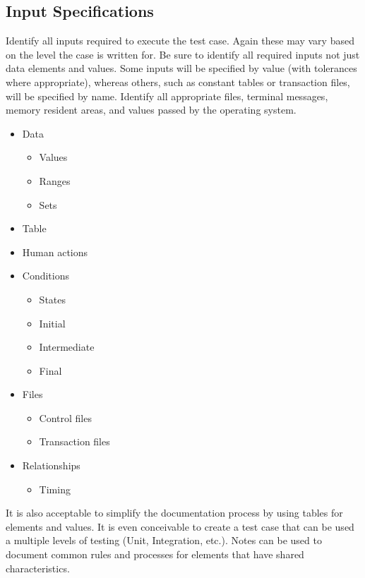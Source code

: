 \documentclass{./template/openetcs_report}
\begin{document}
\subsection{Input Specifications} 

Identify all inputs required to execute the test case. 
Again these may vary based on the level the case is written for. 
Be sure to identify all required inputs not just data elements and values.
Some inputs will be specified by value (with tolerances where appropriate),
whereas others, such as constant tables or transaction files, will be specified
by name. 
Identify all appropriate files, terminal messages, memory
resident areas, and values passed by the operating system.

\begin{itemize}
\item Data 
    \begin{itemize}
    	\item Values 
    	\item Ranges 
    	\item Sets
    \end{itemize} 
\item Table
\item Human actions
\item Conditions 
    \begin{itemize}
    	\item States 
    	\item Initial 
    	\item Intermediate 
    	\item Final
    \end{itemize}
\item Files 
    \begin{itemize}
    	\item Control files 
    	\item Transaction files
    \end{itemize}
\item Relationships 
    \begin{itemize}
        \item Timing 
    \end{itemize}
\end{itemize}

It is also acceptable to simplify the
documentation process by using tables for elements and values. It is even
conceivable to create a test case that can be used a multiple levels of testing
(Unit, Integration, etc.). Notes can be used to document common rules and
processes for elements that have shared characteristics.
\end{document}
